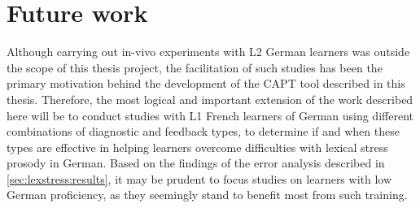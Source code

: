 % 
% 
 
 


\section{Future work}
\label{sec:conclusion:future}

Although carrying out in-vivo experiments with L2 German learners was outside the scope of this thesis project, the facilitation of such studies has been the primary motivation behind the development of the  CAPT tool described in this thesis. Therefore, the most logical and important extension of the work described here will be to conduct studies with L1 French learners of German using different combinations of diagnostic and feedback types, to determine if and when these types are effective in helping learners overcome difficulties with lexical stress prosody in German. 
	Based on the findings of the error analysis described in \cref{sec:lexstress:results}, it may be prudent to focus studies on learners with low German proficiency, as they seemingly stand to benefit most from such training.


